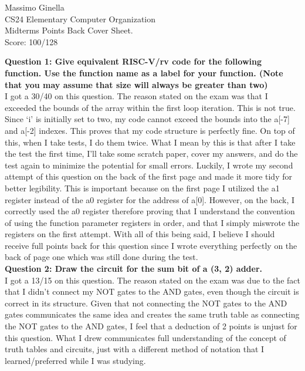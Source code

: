 \documentclass[12pt]{article}
\begin{document}
	\begin{center}
		Massimo Ginella \\
		CS24 Elementary Computer Organization \\
		Midterms Points Back Cover Sheet. \\
		Score: 100/128 \vspace{0.8cm} \\
	\end{center}
	
	
	\textbf{Question 1: Give equivalent RISC-V/rv code for the following function. Use the function name as a label for your function. (Note that you may assume that size will always be greater than two)} \\
	
	I got a 30/40 on this question. The reason stated on the exam was that I exceeded the bounds of the array within the first loop iteration. This is not true. Since `i' is initially set to two, my code cannot exceed the bounds into the a[-7] and a[-2] indexes. This proves that my code structure is perfectly fine. On top of this, when I take tests, I do them twice. What I mean by this is that after I take the test the first time, I'll take some scratch paper, cover my answers, and do the test again to minimize the potential for small errors. Luckily, I wrote my second attempt of this question on the back of the first page and made it more tidy for better legibility. This is important because on the first page I utilized the a1 register instead of the a0 register for the address of a[0]. However, on the back, I correctly used the a0 register therefore proving that I understand the convention of using the function parameter registers in order, and that I simply miswrote the registers on the first attempt. With all of this being said, I believe I should receive full points back for this question since I wrote everything perfectly on the back of page one which was still done during the test.  \vspace{1cm} \\
	
	\textbf{Question 2: Draw the circuit for the sum bit of a (3, 2) adder.} \\
	
	I got a 13/15 on this question. The reason stated on the exam was due to the fact that I didn't connect my NOT gates to the AND gates, even though the circuit is correct in its structure. Given that not connecting the NOT gates to the AND gates communicates the same idea and creates the same truth table as connecting the NOT gates to the AND gates, I feel that a deduction of 2 points is unjust for this question. What I drew communicates full understanding of the concept of truth tables and circuits, just with a different method of notation that I learned/preferred while I was studying. \vspace{1cm} \\
	
\end{document}
